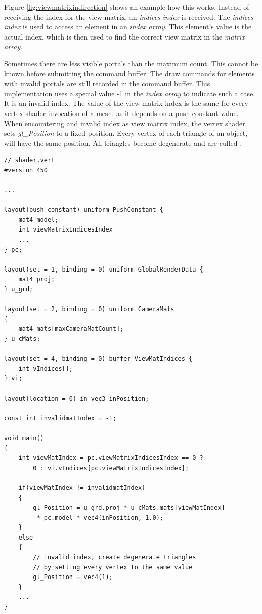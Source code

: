 Figure \ref{fig:viewmatrixindirection} shows an example how this works. Instead of receiving the index for the view matrix, an \textit{indices index} is received. The \textit{indices index} is used to access an element in an \textit{index array}. This element's value is the actual index, which is then used to find the correct view matrix in the \textit{matrix array}.

Sometimes there are less visible portals than the maximum count. This cannot be known before submitting the command buffer. The draw commands for elements with invalid portals are still recorded in the command buffer. This implementation uses a special value -1 in the \textit{index array} to indicate such a case. It is an invalid index. The value of the view matrix index is the same for every vertex shader invocation of a mesh, as it depends on a push constant value. When encountering and invalid index as view matrix index, the vertex shader sets \textit{gl\_Position} to a fixed position. Every vertex of each triangle of an object, will have the same position. All triangles become degenerate and are culled \cite{khronos:vulkan:spec1.1}.

\begin{lstlisting}[caption={View Matrix Selection}, label=listing:viewmatrixselection]
// shader.vert
#version 450

...

layout(push_constant) uniform PushConstant {	
	mat4 model;
	int viewMatrixIndicesIndex
	...
} pc;

layout(set = 1, binding = 0) uniform GlobalRenderData {
	mat4 proj;
} u_grd;

layout(set = 2, binding = 0) uniform CameraMats
{
	mat4 mats[maxCameraMatCount];
} u_cMats;

layout(set = 4, binding = 0) buffer ViewMatIndices {
	int vIndices[];
} vi;

layout(location = 0) in vec3 inPosition;

const int invalidmatIndex = -1;

void main()
{
	int viewMatIndex = pc.viewMatrixIndicesIndex == 0 ? 
		0 : vi.vIndices[pc.viewMatrixIndicesIndex];
	
	if(viewMatIndex != invalidmatIndex)
	{
		gl_Position = u_grd.proj * u_cMats.mats[viewMatIndex]
		 * pc.model * vec4(inPosition, 1.0);
	}
	else
	{
		// invalid index, create degenerate triangles
		// by setting every vertex to the same value
		gl_Position = vec4(1);
	}
	...
}

\end{lstlisting}

